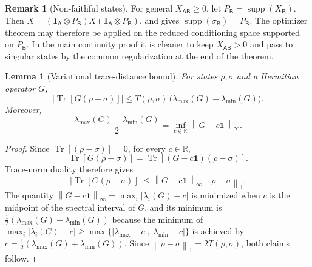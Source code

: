 \documentclass[11pt,reqno]{amsart}
\newtheorem{lemma}[lemma]{Lemma}
\theoremstyle{definition}
\newtheorem{remark}[remark]{Remark}
\DeclareMathOperator{\Tr}{Tr}
\DeclareMathOperator{\supp}{supp}
\newcommand{\I}{\mathbf 1}
\newcommand{\A}{\mathsf{A}}
\newcommand{\B}{\mathsf{B}}
\newcommand{\norm}[1]{\left\lVert#1\right\rVert}
\newcommand{\abs}[1]{\left\lvert#1\right\rvert}
\newcommand{\sand}{\widetilde}
\begin{document}
\begin{remark}[Non-faithful states] \label{remark:sand_support}
For general $X_{\A\B}\geq0$, let $P_{\B}=\supp (X_{\B})$.  Then
$X=(\I_{\A}\otimes P_{\B})X(\I_{\A}\otimes P_{\B})$, and
\cite[Lemma~5]{HT14} gives
$\supp(\sand \sigma_{\B})=P_{\B}$.  The optimizer theorem may therefore be
applied on the reduced conditioning space supported on $P_{\B}$.  
In the main
continuity proof it is cleaner to keep $X_{\A\B}>0$ and pass to singular states by
the common regularization at the end of the theorem.
\end{remark}

\begin{lemma}[Variational trace-distance bound]\label{lemma:trace-distance}
For states $\rho,\sigma$ and a Hermitian operator $G$,
\begin{equation}\label{eq:quotient-duality}
 \abs{\Tr[G(\rho-\sigma)]}
 \leq
 T(\rho,\sigma)\,
 \bigl(\lambda_{\max}(G)-\lambda_{\min}(G)\bigr).
\end{equation}
Moreover,
\begin{equation}\label{eq:quotient-norm}
 \frac{\lambda_{\max}(G)-\lambda_{\min}(G)}{2}
 =\inf_{c\in\mathbb R}\norm{G-c\I}_\infty.
\end{equation}
\end{lemma}

\begin{proof}
Since $\Tr[(\rho-\sigma)]=0$, for every $c\in\mathbb R$,
\[
 \Tr[G(\rho-\sigma)]
 =\Tr[(G-c\I)(\rho-\sigma)].
\]
Trace-norm duality therefore gives
\[
 \abs{\Tr[G(\rho-\sigma)]}
 \leq
 \norm{G-c\I}_\infty\norm{\rho-\sigma}_1.
\]
The quantity $\norm{G-c\I}_\infty = \max_i | \lambda_i(G) - c |$ is minimized when $c$ is the midpoint of
the spectral interval of $G$, and its minimum is
$\frac12(\lambda_{\max}(G)-\lambda_{\min}(G))$ because the minimum of $\max_i | \lambda_i(G) - c |  \geq \max\{|\lambda_{\max}-c|,|\lambda_{\min}-c|\}$ is achieved by $c = \frac12(\lambda_{\max}(G)+\lambda_{\min}(G))$.
Since
$\norm{\rho-\sigma}_1=2T(\rho,\sigma)$, both claims follow.
\end{proof}

\end{document}
